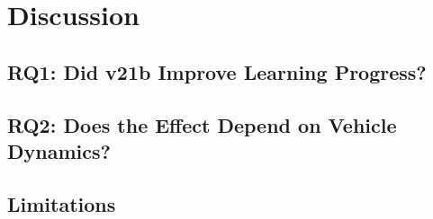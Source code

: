 \section{Discussion}
\label{sec:discussion}


\subsection{RQ1: Did v21b Improve Learning Progress?}

\subsection{RQ2: Does the Effect Depend on Vehicle Dynamics?}
%
%

\subsection{Limitations}

